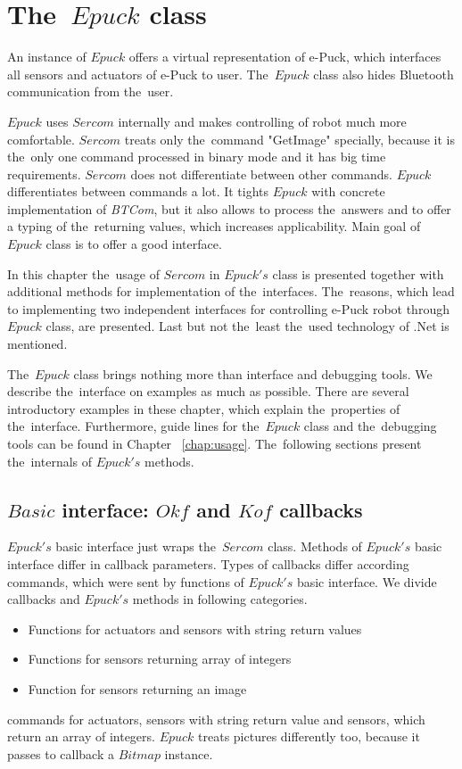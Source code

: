 \section{The~$Epuck$ class} \label{sec:epuck}
  An instance of $Epuck$ offers a virtual representation of e-Puck,
  which interfaces all sensors and actuators of e-Puck to user. 
  The~$Epuck$ class also hides Bluetooth communication from the~user.

  $Epuck$ uses $Sercom$ internally and makes controlling of robot much more comfortable.
  $Sercom$ treats only the~command "GetImage" specially, because it is the~only one command 
  processed in binary mode
  and it has big time requirements. $Sercom$ does not differentiate between other commands.
  $Epuck$ differentiates between commands a lot. 
  It tights $Epuck$ with concrete implementation of {\it BTCom},
  but it also allows to process the~answers and to offer a typing of the~returning values, which increases
  applicability. Main goal of $Epuck$ class is to offer a good interface.

  In this chapter the~usage of $Sercom$ in $Epuck's$ class is presented together with additional methods 
  for implementation of the~interfaces. The~reasons, which lead to implementing two independent interfaces for
  controlling e-Puck robot through $Epuck$ class, are presented.
  Last but not the~least the~used technology of .Net is mentioned.

  The~$Epuck$ class brings nothing more than interface and debugging tools. We describe the~interface
  on examples as much as possible. There are several introductory examples in these chapter,
  which explain the~properties of the~interface. Furthermore, 
  guide lines for the~$Epuck$ class and the~debugging
  tools can be found in Chapter ~\ref{chap:usage}.
  The~following sections present the~internals of $Epuck's$ methods.
  
\subsection{$Basic$ interface: $Okf$ and $Kof$ callbacks} \label{sec:okfkofi}
  $Epuck's$ basic interface just wraps the~$Sercom$ class. Methods of $Epuck's$ basic interface
  differ in callback parameters. Types of callbacks differ according commands, which
  were sent by functions of $Epuck's$ basic interface. 
  We divide callbacks and $Epuck's$ methods in following categories.
  \begin{itemize}
    \item Functions for actuators and sensors with string return values
    \item Functions for sensors returning array of integers
    \item Function for sensors returning an image 
  \end{itemize}
  commands for actuators, sensors with string return value and sensors, which return an array of integers.
  $Epuck$ treats pictures differently too, because it passes to callback a $Bitmap$ instance.


